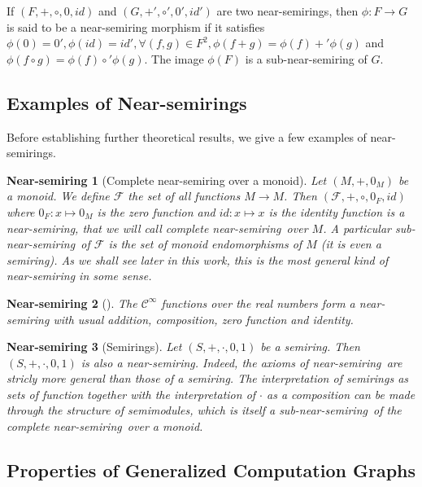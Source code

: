 \documentclass[11pt,a4paper]{article}
\newcommand{\mcal}[1]{\mathcal{#1}}
\newcommand{\Ns}{near-semiring}
\newtheorem{ns}{Near-semiring}
\theoremstyle{definition}
\begin{document}
If $(F,+,\circ,0,id)$ and $(G,+',\circ ',0',id')$ are two near-semirings, then $\phi : F \to G$ is said to be a near-semiring morphism if it satisfies $\phi(0)=0',\phi(id)=id',\forall (f,g) \in F^2, \phi(f+g) = \phi(f) +' \phi(g)$ and $ \phi(f \circ g)= \phi(f) \circ' \phi(g)$. The image $\phi(F)$ is a sub-near-semiring of $G$.



\subsection{Examples of Near-semirings}

Before establishing further theoretical results, we give a few examples of near-semirings. 

\begin{ns}[Complete near-semiring over a monoid]
\label{ns:ns_over_a_monoid}
	Let $(M,+,0_M)$ be a monoid. We define $\mcal{F}$ the set of all functions $M \to M$. Then $(\mcal{F},+,\circ,0_F,id)$ where $0_F : x \mapsto 0_M$ is the zero function and $id : x \mapsto x$ is the identity function is a near-semiring, that we will call complete \Ns\ over $M$. A particular sub-\Ns\ of $\mcal{F}$ is the set of monoid endomorphisms of $M$ (it is even a semiring). As we shall see later in this work, this is the most general kind of near-semiring in some sense.
\end{ns}

\begin{ns}[]

The $\mathcal{C}^\infty$ functions over the real numbers form a near-semiring with usual addition, composition, zero function and identity.

\end{ns}

\begin{ns}[Semirings]
\label{ns:semirings}
	Let $(S,+,\cdot,0,1)$ be a semiring. Then $(S,+,\cdot,0,1)$ is also a \Ns . Indeed, the axioms of \Ns\ are stricly more general than those of a semiring. The interpretation of semirings as sets of function together with the interpretation of $\cdot$ as a composition can be made through the structure of semimodules, which is itself a sub-\Ns\ of the complete \Ns\ over a monoid.
\end{ns}

\subsection{Properties of Generalized Computation Graphs}
\label{subsec:Properties of Generalized Computation Graphs}
\end{document}

